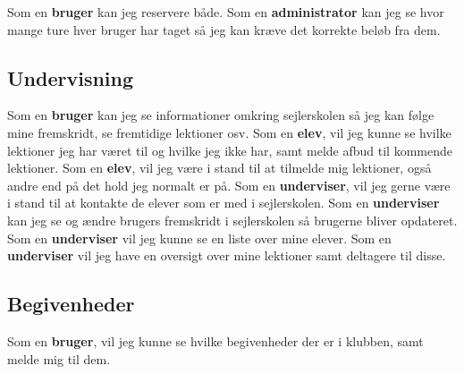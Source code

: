 Som en \textbf{bruger} kan jeg reservere både.
\newline
Som en \textbf{administrator} kan jeg se hvor mange ture hver bruger har taget så jeg kan kræve det korrekte beløb fra dem.

\subsection{Undervisning}
Som en \textbf{bruger} kan jeg se informationer omkring sejlerskolen så jeg kan følge mine fremskridt, se fremtidige lektioner osv.
\newline
Som en \textbf{elev}, vil jeg kunne se hvilke lektioner jeg har været til og hvilke jeg ikke har, samt melde afbud til kommende lektioner.
\newline
Som en \textbf{elev}, vil jeg være i stand til at tilmelde mig lektioner, også andre end på det hold jeg normalt er på.
\newline
Som en \textbf{underviser}, vil jeg gerne være i stand til at kontakte de elever som er med i sejlerskolen.
\newline
Som en \textbf{underviser} kan jeg se og ændre brugers fremskridt i sejlerskolen så brugerne bliver opdateret.
\newline
Som en \textbf{underviser} vil jeg kunne se en liste over mine elever.
\newline
Som en \textbf{underviser} vil jeg have en oversigt over mine lektioner samt deltagere til disse.

\subsection{Begivenheder}
Som en \textbf{bruger}, vil jeg kunne se hvilke begivenheder der er i klubben, samt melde mig til dem.